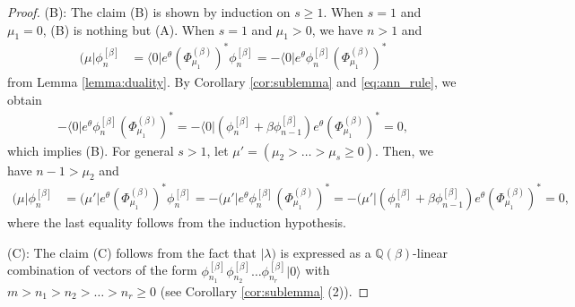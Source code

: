 \documentclass{amsart}
\def\QQ{\mathord{\mathbb{Q}}}
\def\ket#1{\vert #1 \rangle}
\def\bra#1{\langle #1 \vert}
\def\mbra#1{( #1 \vert}
\begin{document}
\begin{proof}
(B):
The claim (B) is shown by induction on $s\geq 1$.
When $s=1$ and $\mu_1=0$, (B) is nothing but (A).
When $s=1$ and $\mu_1>0$, we have $n>1$ and
\[
\begin{aligned}
\mbra{\mu}\phi^{[\beta]}_n
&=
\bra{0}e^\theta (\Phi^{(\beta)}_{\mu_1})^\ast\phi^{[\beta]}_n
=
-\bra{0}e^\theta \phi^{[\beta]}_n(\Phi^{(\beta)}_{\mu_1})^\ast
\end{aligned}
\]
from Lemma \ref{lemma:duality}.
By Corollary \ref{cor:sublemma} and \eqref{eq:ann_rule}, we obtain
\[
\begin{aligned}
-\bra{0}e^\theta \phi^{[\beta]}_n(\Phi^{(\beta)}_{\mu_1})^\ast
=
-\bra{0}(\phi_n^{[\beta]}+\beta \phi^{[\beta]}_{n-1})
e^{\theta}
(\Phi^{(\beta)}_{\mu_1})^\ast=0,
\end{aligned}
\]
which implies (B).
For general $s>1$, let $\mu'=(\mu_2>\dots>\mu_s\geq 0)$.
Then, we have $n-1>\mu_2$ and
\[
\begin{aligned}
\mbra{\mu}\phi^{[\beta]}_n
&=
\mbra{\mu'}e^\theta (\Phi^{(\beta)}_{\mu_1})^\ast\phi^{[\beta]}_n
=
-\mbra{\mu'}e^\theta \phi^{[\beta]}_n(\Phi^{(\beta)}_{\mu_1})^\ast
=
-\mbra{\mu'}(\phi_n^{[\beta]}+\beta \phi^{[\beta]}_{n-1})
e^{\theta}
(\Phi^{(\beta)}_{\mu_1})^\ast=0,
\end{aligned}
\]
where the last equality follows from the induction hypothesis.

(C):
The claim (C) follows from the fact that $|\lambda)$ is expressed as a $\QQ(\beta)$-linear combination of vectors of the form
$\phi^{[\beta]}_{n_1}\phi^{[\beta]}_{n_2}\dots 
\phi^{[\beta]}_{n_r}\ket{0}$ with $m>n_1>n_2>\dots>n_r\geq 0$
(see Corollary \ref{cor:sublemma} (2)).
\end{proof}
\end{document}
